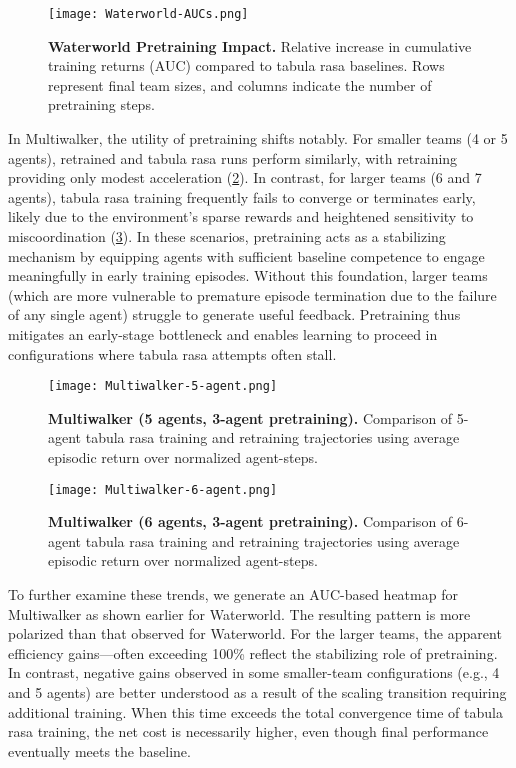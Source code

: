 \documentclass{article}
\begin{document}
\begin{figure}[ht]
    \centering
    \texttt{[image: Waterworld-AUCs.png]}
    \caption{\textbf{Waterworld Pretraining Impact.} 
    Relative increase in cumulative training returns (AUC) compared to tabula rasa baselines. 
    Rows represent final team sizes, and columns indicate the number of pretraining steps.}
    \label{con1:fig:waterworld-aucs}
\end{figure}

In Multiwalker, the utility of pretraining shifts notably. 
For smaller teams (4 or 5 agents), retrained and tabula rasa runs perform similarly, 
with retraining providing only modest acceleration (\cref{con1:fig:multiwalker-5}). 
In contrast, for larger teams (6 and 7 agents), tabula rasa training frequently fails to 
converge or terminates early, likely due to the environment's sparse rewards and heightened 
sensitivity to miscoordination (\cref{con1:fig:multiwalker-6}). 
In these scenarios, pretraining acts as a stabilizing mechanism by equipping agents 
with sufficient baseline competence to engage meaningfully in early training episodes. 
Without this foundation, larger teams (which are more vulnerable to premature episode termination 
due to the failure of any single agent) struggle to generate useful feedback. 
Pretraining thus mitigates an early-stage bottleneck and enables learning to proceed 
in configurations where tabula rasa attempts often stall.

\begin{figure}[!ht]
    \centering
    \texttt{[image: Multiwalker-5-agent.png]}
    \caption{\textbf{Multiwalker (5 agents, 3-agent pretraining).} Comparison of 
    5-agent tabula rasa training and retraining trajectories using average 
    episodic return over normalized agent-steps.}
    \label{con1:fig:multiwalker-5}
\end{figure}

\vspace{2em}

\begin{figure}[!ht]
    \centering
    \texttt{[image: Multiwalker-6-agent.png]}
    \caption{\textbf{Multiwalker (6 agents, 3-agent pretraining).} Comparison of 
    6-agent tabula rasa training and retraining trajectories using average 
    episodic return over normalized agent-steps.}
    \label{con1:fig:multiwalker-6}
\end{figure}

To further examine these trends, we generate an AUC-based 
heatmap for Multiwalker as shown earlier for Waterworld. 
The resulting pattern is more polarized than that observed for Waterworld.
For the larger teams, the apparent efficiency gains—often exceeding 100\% 
reflect the stabilizing role of pretraining. In contrast, 
negative gains observed in some smaller-team configurations (e.g., 4 and 5 agents) 
are better understood as a result of the scaling transition requiring additional training. 
When this time exceeds the total convergence time of tabula rasa training, the net cost 
is necessarily higher, even though final performance eventually meets the baseline.
\end{document}
